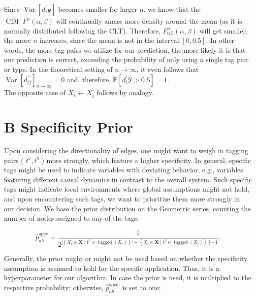 \documentclass[10pt]{article}
\begin{document}
Since $\operatorname{Var}\left[d_{i}^{\prime} \mathcal{y}\right]$ becomes smaller for larger $n$, we know that the $\operatorname{CDF} F^{n}(\alpha, \beta)$ will continually amass more density around the mean (as it is normally distributed following the CLT). Therefore, $F_{0.5}^{n}(\alpha, \beta)$ will get smaller, the more $n$ increases, since the mean is not in the interval $[0,0.5]$. In other words, the more tag pairs we utilize for our prediction, the more likely it is that our prediction is correct, exceeding the probability of only using a single tag pair or type. In the theoretical setting of $n \rightarrow \infty$, it even follows that $\operatorname{Var}\left[d_{i}^{\prime}{ }_{j}^{\prime}\right]_{n \rightarrow \infty}=0$ and, therefore, $\mathbb{P}\left[d_{i}^{\prime} \mathcal{Y}>0.5\right]=1$.\\
The opposite case of $X_{i} \leftarrow X_{j}$ follows by analogy.

\section*{B Specificity Prior}
Upon considering the directionality of edges, one might want to weigh in tagging pairs ( $t^{a}, t^{b}$ ) more strongly, which feature a higher specificity. In general, specific tags might be used to indicate variables with deviating behavior, e.g., variables featuring different causal dynamics in contrast to the overall system. Such specific tags might indicate local environments where global assumptions might not hold, and upon encountering such tags, we want to prioritize them more strongly in our decision. We base the prior distribution on the Geometric series, counting the number of nodes assigned to any of the tags:


\begin{equation*}
\hat{p}_{a b}^{\mathrm{spec}}=\frac{1}{2^{\left|\left\{X_{i} \in \mathbf{X} \mid \mathrm{t}^{a} \in \operatorname{tagged}\left(X_{i}\right)\right\}\right|+\left\{X_{i} \in \mathbf{X} \mid \mathrm{t}^{b} \in \operatorname{tagged}\left(X_{i}\right)\right\} \mid-1}} . \tag{13}
\end{equation*}


Generally, the prior might or might not be used based on whether the specificity assumption is assumed to hold for the specific application. Thus, it is a hyperparameter for our algorithm. In case the prior is used, it is multiplied to the respective probability; otherwise, $\hat{p}_{a b}^{\text {spec }}$ is set to one:
\end{document}
